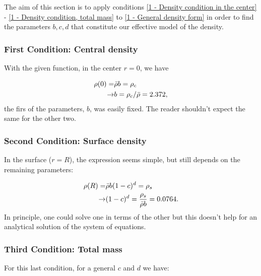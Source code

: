 \documentclass[aps,twocolumn,showpacs,preprintnumbers]{revtex4}
\begin{document}
    The aim of this section is to apply conditions \eqref{1 - Density condition in the center} - \eqref{1 - Density condition, total mass} to \eqref{1 - General density form} in order to find the parameters $b,c,d$ that constitute our effective model of the density.
    
    \subsubsection{First Condition: Central density}
    
    With the given function, in the center $r = 0$, we have
    
    \begin{equation}
    \begin{aligned}
        \rho(0) =& \Bar{\rho} b = \rho_c \\ 
                \rightarrow & b = \rho_c / \Bar{\rho} = 2.372,
    \end{aligned} 
    \label{1 - First condition, equation}
    \end{equation}
    the firs of the parameters, $b$, was easily fixed. The reader shouldn't expect the same for the other two. 
    
    \subsubsection{Second Condition: Surface density}
    
    In the surface ($r=R$), the expression seems simple, but still depends on the remaining parameters:
    
    \begin{equation}
    \begin{aligned}
        \rho (R ) =& \Bar{\rho} b (1 - c)^d = \rho_s \\
        \rightarrow& (1-c)^d = \frac{\rho_s}{\Bar{\rho} b} = 0.0764.
    \end{aligned}
     \label{1 - Second condition, equation}
    \end{equation}
    In principle, one could solve one in terms of the other but this doesn't help for an analytical solution of the system of equations.
    
    \subsubsection{Third Condition: Total mass}
    
    For this last condition, for a general $c$ and $d$ we have:
    
\end{document}
